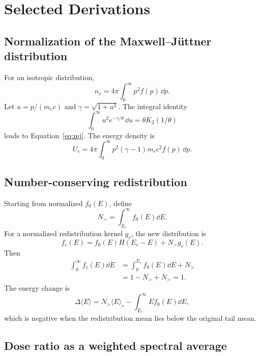 \chapter{Selected Derivations}
\label{app:derivations}

\section{Normalization of the Maxwell--J\"uttner distribution}

For an isotropic distribution,
\begin{equation}
 n_e=4\pi\int_0^\infty p^2 f(p)\,\dd p.
\end{equation}
Let $u=p/(m_ec)$ and $\gamma=\sqrt{1+u^2}$. The integral identity
\begin{equation}
\int_0^\infty u^2e^{-\gamma/\theta}\,\dd u
=\theta K_2(1/\theta)
\end{equation}
leads to Equation~\eqref{eq:mj}. The energy density is
\begin{equation}
U_e=4\pi\int_0^\infty p^2(\gamma-1)m_ec^2f(p)\,\dd p.
\end{equation}

\section{Number-conserving redistribution}

Starting from normalized $f_0(E)$, define
\begin{equation}
N_>=\int_{E_c}^{\infty}f_0(E)\dd E.
\end{equation}
For a normalized redistribution kernel $g_r$, the new distribution is
\begin{equation}
f_c(E)=f_0(E)H(E_c-E)+N_>g_r(E).
\end{equation}
Then
\begin{align}
\int_0^\infty f_c(E)\dd E
&=\int_0^{E_c}f_0(E)\dd E+N_>\\
&=1-N_>+N_>=1.
\end{align}
The energy change is
\begin{equation}
\Delta\langle E\rangle
=N_>\langle E\rangle_r-\int_{E_c}^{\infty}Ef_0(E)\dd E,
\end{equation}
which is negative when the redistribution mean lies below the original tail mean.

\section{Dose ratio as a weighted spectral average}

